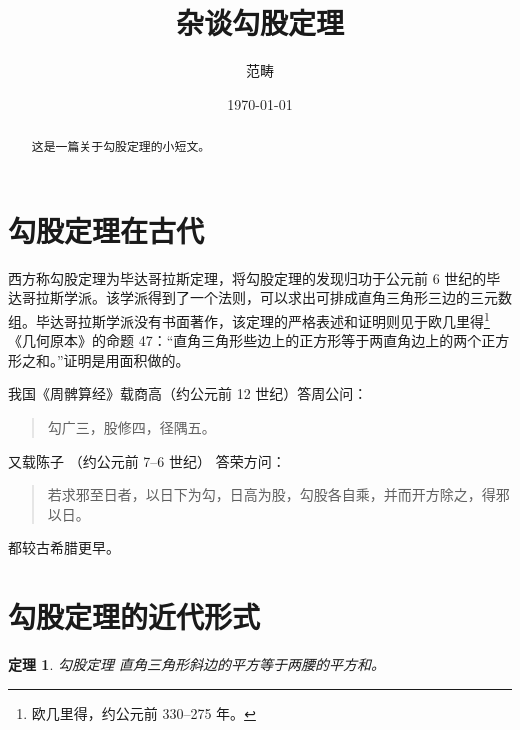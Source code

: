 \documentclass[UTF8]{ctexart}
\title{杂谈勾股定理}
\author{范畴}
\date{\today}
\begin{document}
\maketitle
\begin{abstract}
这是一篇关于勾股定理的小短文。
\end{abstract}

\tableofcontents
\section{勾股定理在古代}

西方称勾股定理为毕达哥拉斯定理，将勾股定理的发现归功于公元前 6 世纪的毕达哥拉斯学派。该学派得到了一个法则，可以求出可排成直角三角形三边的三元数组。毕达哥拉斯学派没有书面著作，该定理的严格表述和证明则见于欧几里得\footnote{欧几里得，约公元前 330--275 年。}《几何原本》的命题 47：“直角三角形些边上的正方形等于两直角边上的两个正方形之和。”证明是用面积做的。

我国《周髀算经》载商高（约公元前 12 世纪）答周公问：
\begin{quote}
\kaishu
勾广三，股修四，径隅五。
\end{quote}
又载陈子 （约公元前 7--6 世纪） 答荣方问：
\begin{quote}
\kaishu
若求邪至日者，以日下为勾，日高为股，勾股各自乘，并而开方除之，得邪以日。
\end{quote}
都较古希腊更早。



\section{勾股定理的近代形式}
\newtheorem{thm}{定理}
\begin{thm}{勾股定理}
直角三角形斜边的平方等于两腰的平方和。
\end{thm}


\end{document}
